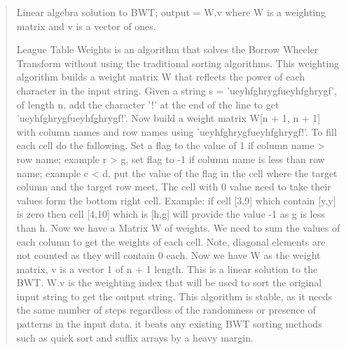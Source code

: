 \documentclass{article}
\begin{document}
\begin{quote}
\begin{center}Linear algebra solution to BWT; output = W.v where W is a weighting matrix and v is a vector of ones.\end{center}
League Table Weights is an algorithm that solves the Borrow Wheeler Transform without using the traditional sorting algorithms. This weighting algorithm builds a weight matrix W that reflects the power of each character in the input string. Given a string s = 'ueyhfghrygfueyhfghrygf', of length n, add the character '!' at the end of the line to get 'ueyhfghrygfueyhfghrygf!'. Now build a weight matrix W[n + 1, n + 1] with column names and row names using 'ueyhfghrygfueyhfghrygf!'. To fill each cell do the fallowing. Set a flag to the value of 1 if column name > row name; example r > g, set flag to -1 if column name is less than row name; example c < d, put the value of the flag in the cell where the target column and the target row meet. The cell with 0 value need to take their values form the bottom right cell. Example: if cell [3,9] which contain [y,y] is zero then cell [4,10] which is [h,g] will provide the value -1 as g is less than h. Now we have a Matrix W of weights. We need to sum the values of each column to get the weights of each cell. Note, diagonal elements are not counted as they will contain 0 each. Now we have W as the weight matrix, v is a vector 1 of n + 1 length. This is a linear solution to the BWT. W.v is the weighting index that will be used to sort the original input string to get the output string.  This algorithm is stable, as it needs the same number of steps regardless of the randomness or presence of patterns in the input data.  it beats any existing BWT sorting methods such as quick sort and suffix arrays by a heavy margin.
\end{quote}
\end{document}
